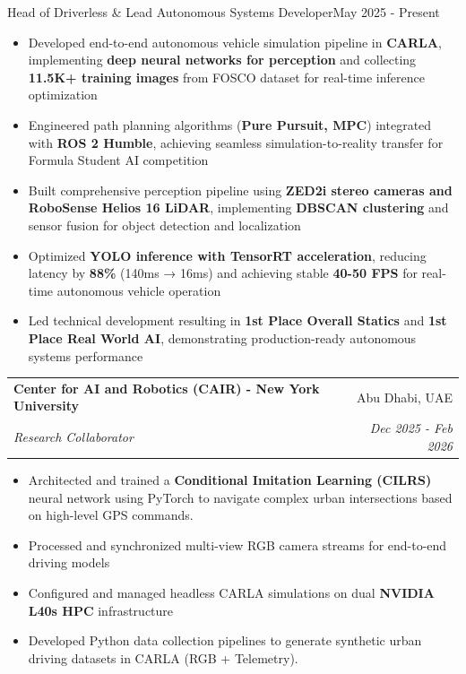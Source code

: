 \documentclass[a4paper,20pt]{article}
\makeatletter
\newcommand{\resumeItemWithoutTitle}[1] {
	\item\small{
		{#1 \vspace{-2pt}}
	}
}
\newcommand{\resumeSubheading}[4] {
	\vspace{-1pt}\item
	\begin{tabular*}{0.97\textwidth}{l@{\extracolsep{\fill}}r}
		\textbf{#1} & #2 \\
		\textit{#3} & \textit{#4} \\
	\end{tabular*}\vspace{-5pt}
}
\newcommand{\resumeItemListStart}{\begin{itemize}}
\newcommand{\resumeItemListEnd}{\end{itemize}\vspace{-5pt}}
\makeatother
\begin{document}
{Head of Driverless \& Lead Autonomous Systems Developer}{May 2025 - Present}
        \resumeItemListStart
            \resumeItemWithoutTitle{Developed end-to-end autonomous vehicle simulation pipeline in \textbf{CARLA}, implementing \textbf{deep neural networks for perception} and collecting \textbf{11.5K+ training images} from FOSCO dataset for real-time inference optimization}
            \resumeItemWithoutTitle{Engineered path planning algorithms (\textbf{Pure Pursuit, MPC}) integrated with \textbf{ROS 2 Humble}, achieving seamless simulation-to-reality transfer for Formula Student AI competition}
            \resumeItemWithoutTitle{Built comprehensive perception pipeline using \textbf{ZED2i stereo cameras and RoboSense Helios 16 LiDAR}, implementing \textbf{DBSCAN clustering} and sensor fusion for object detection and localization}
            \resumeItemWithoutTitle{Optimized \textbf{YOLO inference with TensorRT acceleration}, reducing latency by \textbf{88\%} (140ms → 16ms) and achieving stable \textbf{40-50 FPS} for real-time autonomous vehicle operation}
            \resumeItemWithoutTitle{Led technical development resulting in \textbf{1st Place Overall Statics} and \textbf{1st Place Real World AI}, demonstrating production-ready autonomous systems performance}
        \resumeItemListEnd
		\vspace{5pt}
		\resumeSubheading{Center for AI and Robotics (CAIR) - New York University}{Abu Dhabi, UAE}
	{Research Collaborator}{Dec 2025 - Feb 2026}
			\resumeItemListStart
				\resumeItemWithoutTitle{Architected and trained a \textbf{Conditional Imitation Learning (CILRS)} neural network using PyTorch to navigate complex urban intersections based on high-level GPS commands.}
				\resumeItemWithoutTitle{Processed and synchronized multi-view RGB camera streams for end-to-end driving models}
				\resumeItemWithoutTitle{Configured and managed headless CARLA simulations on dual \textbf{NVIDIA L40s HPC} infrastructure}
				\resumeItemWithoutTitle{Developed Python data collection pipelines to generate synthetic urban driving datasets in CARLA (RGB + Telemetry).}
			\resumeItemListEnd
\end{document}
